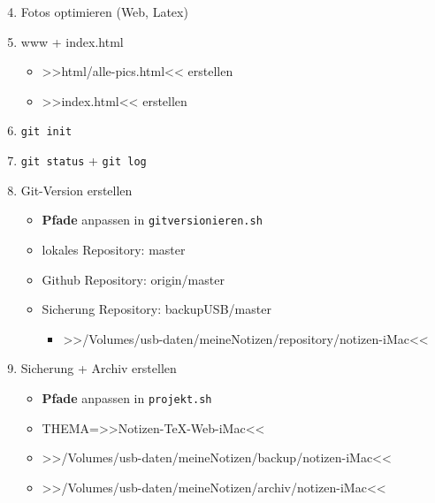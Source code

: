 \begin{enumerate}
\setcounter{enumi}{3}
\item
  Fotos optimieren (Web, Latex)
\item
  www + index.html

  \begin{itemize}
  \item
    >>html/alle-pics.html<< erstellen
  \item
    >>index.html<< erstellen
  \end{itemize}
\item
  \verb|git init|
\item
  \verb|git status| +
  \verb|git log|
\item
  Git-Version erstellen

  \begin{itemize}
  \item
    \textbf{Pfade} anpassen in
    \verb|gitversionieren.sh|
  \item
    lokales Repository: master
  \item
    Github Repository: origin/master
  \item
    Sicherung Repository: backupUSB/master

    \begin{itemize}
    \item
      >>/Volumes/usb-daten/meineNotizen/repository/notizen-iMac<<
    \end{itemize}
  \end{itemize}
\item
  Sicherung + Archiv erstellen

  \begin{itemize}
  \item
    \textbf{Pfade} anpassen in \verb|projekt.sh|
  \item
    THEMA=>>Notizen-TeX-Web-iMac<<
  \item
    >>/Volumes/usb-daten/meineNotizen/backup/notizen-iMac<<
  \item
    >>/Volumes/usb-daten/meineNotizen/archiv/notizen-iMac<<
  \end{itemize}
\end{enumerate}
